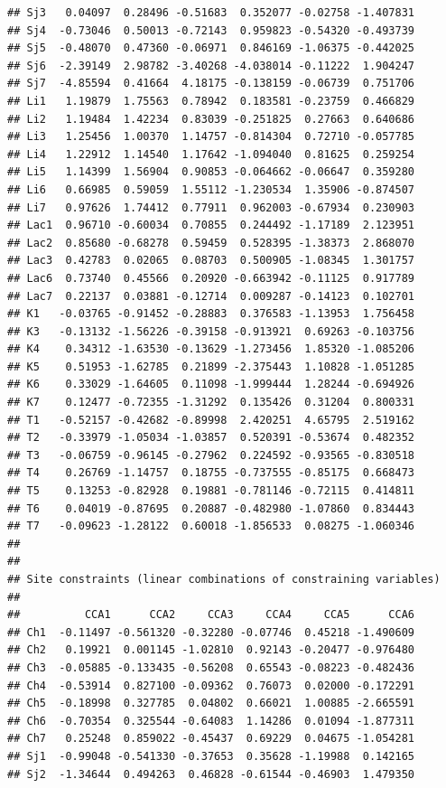 \documentclass[
]{book}
\begin{document}
\begin{verbatim}
## Sj3   0.04097  0.28496 -0.51683  0.352077 -0.02758 -1.407831
## Sj4  -0.73046  0.50013 -0.72143  0.959823 -0.54320 -0.493739
## Sj5  -0.48070  0.47360 -0.06971  0.846169 -1.06375 -0.442025
## Sj6  -2.39149  2.98782 -3.40268 -4.038014 -0.11222  1.904247
## Sj7  -4.85594  0.41664  4.18175 -0.138159 -0.06739  0.751706
## Li1   1.19879  1.75563  0.78942  0.183581 -0.23759  0.466829
## Li2   1.19484  1.42234  0.83039 -0.251825  0.27663  0.640686
## Li3   1.25456  1.00370  1.14757 -0.814304  0.72710 -0.057785
## Li4   1.22912  1.14540  1.17642 -1.094040  0.81625  0.259254
## Li5   1.14399  1.56904  0.90853 -0.064662 -0.06647  0.359280
## Li6   0.66985  0.59059  1.55112 -1.230534  1.35906 -0.874507
## Li7   0.97626  1.74412  0.77911  0.962003 -0.67934  0.230903
## Lac1  0.96710 -0.60034  0.70855  0.244492 -1.17189  2.123951
## Lac2  0.85680 -0.68278  0.59459  0.528395 -1.38373  2.868070
## Lac3  0.42783  0.02065  0.08703  0.500905 -1.08345  1.301757
## Lac6  0.73740  0.45566  0.20920 -0.663942 -0.11125  0.917789
## Lac7  0.22137  0.03881 -0.12714  0.009287 -0.14123  0.102701
## K1   -0.03765 -0.91452 -0.28883  0.376583 -1.13953  1.756458
## K3   -0.13132 -1.56226 -0.39158 -0.913921  0.69263 -0.103756
## K4    0.34312 -1.63530 -0.13629 -1.273456  1.85320 -1.085206
## K5    0.51953 -1.62785  0.21899 -2.375443  1.10828 -1.051285
## K6    0.33029 -1.64605  0.11098 -1.999444  1.28244 -0.694926
## K7    0.12477 -0.72355 -1.31292  0.135426  0.31204  0.800331
## T1   -0.52157 -0.42682 -0.89998  2.420251  4.65795  2.519162
## T2   -0.33979 -1.05034 -1.03857  0.520391 -0.53674  0.482352
## T3   -0.06759 -0.96145 -0.27962  0.224592 -0.93565 -0.830518
## T4    0.26769 -1.14757  0.18755 -0.737555 -0.85175  0.668473
## T5    0.13253 -0.82928  0.19881 -0.781146 -0.72115  0.414811
## T6    0.04019 -0.87695  0.20887 -0.482980 -1.07860  0.834443
## T7   -0.09623 -1.28122  0.60018 -1.856533  0.08275 -1.060346
## 
## 
## Site constraints (linear combinations of constraining variables)
## 
##          CCA1      CCA2     CCA3     CCA4     CCA5      CCA6
## Ch1  -0.11497 -0.561320 -0.32280 -0.07746  0.45218 -1.490609
## Ch2   0.19921  0.001145 -1.02810  0.92143 -0.20477 -0.976480
## Ch3  -0.05885 -0.133435 -0.56208  0.65543 -0.08223 -0.482436
## Ch4  -0.53914  0.827100 -0.09362  0.76073  0.02000 -0.172291
## Ch5  -0.18998  0.327785  0.04802  0.66021  1.00885 -2.665591
## Ch6  -0.70354  0.325544 -0.64083  1.14286  0.01094 -1.877311
## Ch7   0.25248  0.859022 -0.45437  0.69229  0.04675 -1.054281
## Sj1  -0.99048 -0.541330 -0.37653  0.35628 -1.19988  0.142165
## Sj2  -1.34644  0.494263  0.46828 -0.61544 -0.46903  1.479350

\end{verbatim}
\end{document}
